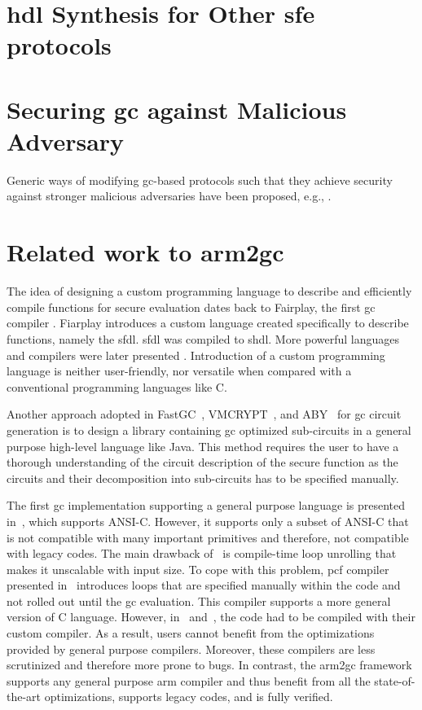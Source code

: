 \section{\acrshort{hdl} Synthesis for Other \acrshort{sfe} protocols}

\section{Securing \acrshort{gc} against Malicious Adversary}
Generic ways of modifying \acrshort{gc}-based protocols such that they achieve security against stronger malicious adversaries have been proposed, e.g., \cite{lindell2007efficient, lindell2012secure, nielsen2009lego}.

\section{Related work to \gls{arm2gc}}
The idea of designing a custom programming language to describe and efficiently compile functions for secure evaluation dates back to Fairplay, the first \acrshort{gc} compiler \cite{malkhi2004fairplay}.
Fiarplay introduces a custom language created specifically to describe functions, namely the \acrfull{sfdl}.
\acrshort{sfdl} was compiled to \acrfull{shdl}.
More powerful languages and compilers were later presented \cite{HKSSW10, kreuter2012billion, rastogi2014wysteria}.
Introduction of a custom programming language is neither user-friendly, nor versatile when compared with a conventional programming languages like C.

Another approach adopted in FastGC~\cite{huang2011faster, HS13}, VMCRYPT~\cite{malka2011vmcrypt}, and ABY~\cite{demmler15aby} for \acrshort{gc} circuit generation is to design a library containing \acrshort{gc} optimized sub-circuits in a general purpose high-level language like Java.
This method requires the user to have a thorough understanding of the circuit description of the secure function as the circuits and their decomposition into sub-circuits has to be specified manually.

The first \acrshort{gc} implementation supporting a general purpose language is presented in~\cite{holzer2012secure}, which supports ANSI-C.
However, it supports only a subset of ANSI-C that is not compatible with many important primitives and therefore, not compatible with legacy codes.
The main drawback of~\cite{holzer2012secure} is compile-time loop unrolling that makes it unscalable with input size.
To cope with this problem, \gls{pcf} compiler presented in~\cite{kreuter2013pcf} introduces loops that are specified manually within the code and not rolled out until the \acrshort{gc} evaluation.
This compiler supports a more general version of C language.
However, in~\cite{holzer2012secure} and~\cite{kreuter2013pcf}, the code had to be compiled with their custom compiler.
As a result, users cannot benefit from the optimizations provided by general purpose compilers.
Moreover, these compilers are less scrutinized and therefore more prone to bugs.
In contrast, the \gls{arm2gc} framework supports any general purpose \gls{arm} compiler and thus benefit from all the state-of-the-art optimizations, supports legacy codes, and is fully verified.

